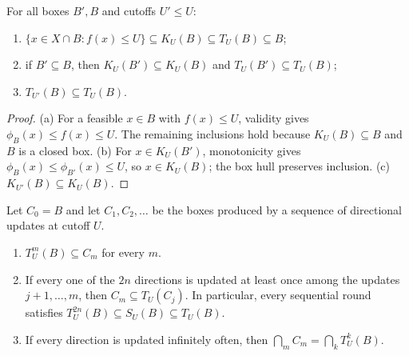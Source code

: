 \begin{lemma}\label{lem:order}
For all boxes $B',B$ and cutoffs $U'\le U$:
\begin{enumerate}[label=(\alph*)]
\item $\{x\in X\cap B:f(x)\le U\}\subseteq K_U(B)\subseteq T_U(B)\subseteq B$;
\item if $B'\subseteq B$, then $K_U(B')\subseteq K_U(B)$ and
  $T_U(B')\subseteq T_U(B)$;
\item $T_{U'}(B)\subseteq T_U(B)$.
\end{enumerate}
\end{lemma}

\begin{proof}
(a) For a feasible $x\in B$ with $f(x)\le U$, validity gives
$\phi_B(x)\le f(x)\le U$. The remaining inclusions hold because
$K_U(B)\subseteq B$ and $B$ is a closed box. (b) For $x\in K_U(B')$,
monotonicity gives $\phi_B(x)\le\phi_{B'}(x)\le U$, so $x\in K_U(B)$; the
box hull preserves inclusion. (c) $K_{U'}(B)\subseteq K_U(B)$.
\end{proof}

\begin{lemma}\label{lem:sequential}
Let $C_0=B$ and let $C_1,C_2,\dots$ be the boxes produced by a sequence of
directional updates at cutoff $U$.
\begin{enumerate}[label=(\alph*)]
\item $T_U^m(B)\subseteq C_m$ for every $m$.
\item If every one of the $2n$ directions is updated at least once among
  the updates $j+1,\dots,m$, then $C_m\subseteq T_U(C_j)$. In particular,
  every sequential round satisfies $T_U^{2n}(B)\subseteq S_U(B)\subseteq T_U(B)$.
\item If every direction is updated infinitely often, then
  $\bigcap_mC_m=\bigcap_kT_U^k(B)$.
\end{enumerate}
\end{lemma}

